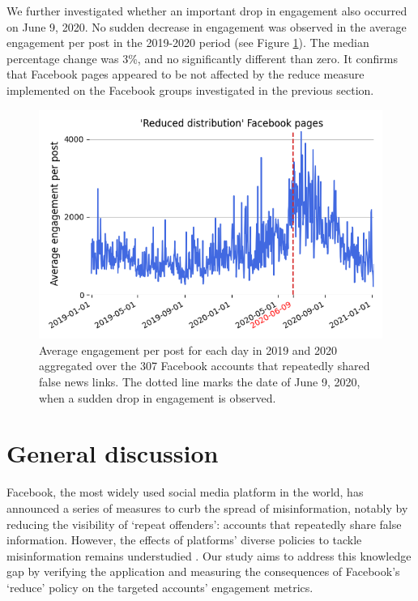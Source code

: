 \documentclass[11pt,a4paper]{article}
\begin{document}
We further investigated whether an important drop in engagement also occurred on June 9, 2020. 
No sudden decrease in engagement was observed in the average engagement per post in the 2019-2020 period (see Figure \ref{reduce_average_timeseries}).
The median percentage change was 3\%, and no significantly different than zero.
It confirms that Facebook pages appeared to be not affected by the reduce measure implemented on the Facebook groups investigated in the previous section.

\begin{figure}[!h]
\centering
\includegraphics[width=\linewidth]{./../figure/reduce_average_timeseries.png}
\caption{Average engagement per post for each day in 2019 and 2020 aggregated over the 307 Facebook accounts that repeatedly shared false news links. The dotted line marks the date of June 9, 2020, when a sudden drop in engagement is observed.}
\label{reduce_average_timeseries}
\end{figure}


\section{General discussion}

Facebook, the most widely used social media platform in the world, has announced a series of measures to curb the spread of misinformation, notably by reducing the visibility of `repeat offenders': accounts that repeatedly share false information. However, the effects of platforms' diverse policies to tackle misinformation remains understudied \citep{pasquetto2020tackling}. 
Our study aims to address this knowledge gap by verifying the application and measuring the consequences of Facebook's `reduce' policy on the targeted accounts' engagement metrics.
\end{document}
